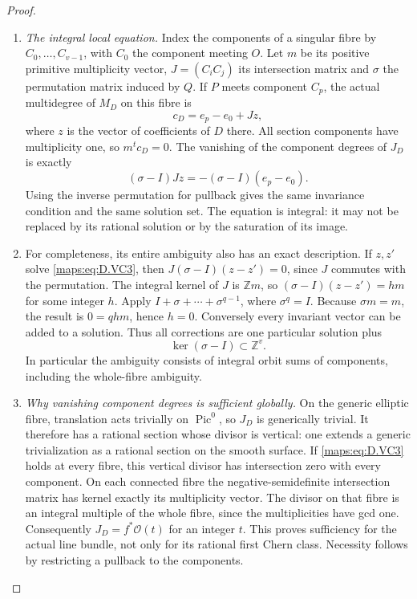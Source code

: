 \begin{proof}
\begin{enumerate}[label=\arabic*.,leftmargin=*]
\item \emph{The integral local equation.}
Index the components of a singular fibre by $C_0,\ldots,C_{v-1}$,
with $C_0$ the component meeting $O$. Let $m$ be its positive
primitive multiplicity vector, $J=(C_iC_j)$ its intersection
matrix and $\sigma$ the permutation matrix induced by $Q$.
If $P$ meets component $C_p$, the actual multidegree of
$M_D$ on this fibre is
\[
                    c_D=e_p-e_0+Jz,
                                                        \tag{D.VC2}\label{maps:eq:D.VC2}
\]
where $z$ is the vector of coefficients of $D$ there.
All section components have multiplicity one, so $m^tc_D=0$.
The vanishing of the component degrees of $J_D$ is exactly
\[
                 (\sigma-I)Jz=-(\sigma-I)(e_p-e_0).
                                                        \tag{D.VC3}\label{maps:eq:D.VC3}
\]
Using the inverse permutation for pullback gives the same
invariance condition and the same solution set.
The equation is integral: it may not be replaced by its
rational solution or by the saturation of its image.

\item For completeness, its entire ambiguity also has an exact
description. If $z,z'$ solve \eqref{maps:eq:D.VC3}, then
$J(\sigma-I)(z-z')=0$, since $J$ commutes with the permutation.
The integral kernel of $J$ is $\mathbb Zm$, so
$(\sigma-I)(z-z')=h m$ for some integer $h$.
Apply $I+\sigma+\cdots+\sigma^{q-1}$, where $\sigma^q=I$.
Because $\sigma m=m$, the result is $0=qh m$, hence $h=0$.
Conversely every invariant vector can be added to a solution.
Thus all corrections are one particular solution plus
\[
                         \ker(\sigma-I)\subset\mathbb Z^v.
                                                        \tag{D.VC4}\label{maps:eq:D.VC4}
\]
In particular the ambiguity consists of integral orbit sums
of components, including the whole-fibre ambiguity.

\item \emph{Why vanishing component degrees is sufficient globally.}
On the generic elliptic fibre, translation acts trivially
on $\operatorname{Pic}^0$, so $J_D$ is generically trivial.
It therefore has a rational section whose divisor is vertical:
one extends a generic trivialization as a rational section
on the smooth surface. If \eqref{maps:eq:D.VC3} holds at every fibre,
this vertical divisor has intersection zero with every
component. On each connected fibre the negative-semidefinite
intersection matrix has kernel exactly its multiplicity
vector. The divisor on that fibre is an integral multiple
of the whole fibre, since the multiplicities have gcd one.
Consequently $J_D=f^*\mathcal O(t)$ for an integer $t$.
This proves sufficiency for the actual line bundle, not
only for its rational first Chern class. Necessity follows
by restricting a pullback to the components.


\end{enumerate}
\end{proof}

